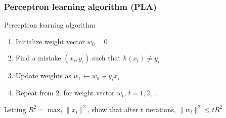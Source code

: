 \documentclass[10pt]{beamer}
\begin{document}

\begin{frame}
  \frametitle{Perceptron learning algorithm (PLA)}
  \begin{block}{Perceptron learning algorithm}
  \begin{enumerate}
	\item Initialize weight vector $w_0=0$
	\item Find a {\color{red} mistake} $(x_i,y_i)$ such that $h(x_i)\neq y_i$
	\item Update weights as $w_1\leftarrow w_0+y_ix_i$
	\item Repeat from 2. for weight vector $w_t$, $t=1,2,\ldots$
  \end{enumerate}
  \end{block}
  Letting $R^2=\max_i \lVert x_i \rVert^2$, show that after $t$ iterations, $\lVert w_t \rVert^2 \leq t R^2$ 
\end{frame}
\end{document}
